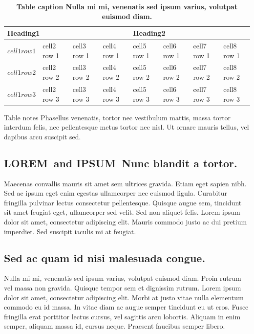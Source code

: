 \documentclass[10pt,letterpaper]{article}
\newcommand{\lorem}{{\bf LOREM}}
\newcommand{\ipsum}{{\bf IPSUM}}
\begin{document}
\begin{table}[!ht]
\begin{adjustwidth}{-2.25in}{0in} %
\caption{
{\bf Table caption Nulla mi mi, venenatis sed ipsum varius, volutpat euismod diam.}}
\begin{tabular}{|l|l|l|l|l|l|l|l|}
\hline
\multicolumn{4}{|l|}{\bf Heading1} & \multicolumn{4}{|l|}{\bf Heading2}\\ \hline
$cell1 row1$ & cell2 row 1 & cell3 row 1 & cell4 row 1 & cell5 row 1 & cell6 row 1 & cell7 row 1 & cell8 row 1\\ \hline
$cell1 row2$ & cell2 row 2 & cell3 row 2 & cell4 row 2 & cell5 row 2 & cell6 row 2 & cell7 row 2 & cell8 row 2\\ \hline
$cell1 row3$ & cell2 row 3 & cell3 row 3 & cell4 row 3 & cell5 row 3 & cell6 row 3 & cell7 row 3 & cell8 row 3\\ \hline
\end{tabular}
\begin{flushleft} Table notes Phasellus venenatis, tortor nec vestibulum mattis, massa tortor interdum felis, nec pellentesque metus tortor nec nisl. Ut ornare mauris tellus, vel dapibus arcu suscipit sed.
\end{flushleft}
\label{table1}
\end{adjustwidth}
\end{table}



\subsection*{\lorem\ and \ipsum\ Nunc blandit a tortor.}

Maecenas convallis mauris sit amet sem ultrices gravida. Etiam eget sapien nibh. Sed ac ipsum eget enim egestas ullamcorper nec euismod ligula. Curabitur fringilla pulvinar lectus consectetur pellentesque. Quisque augue sem, tincidunt sit amet feugiat eget, ullamcorper sed velit. Sed non aliquet felis. Lorem ipsum dolor sit amet, consectetur adipiscing elit. Mauris commodo justo ac dui pretium imperdiet. Sed suscipit iaculis mi at feugiat. 

\subsection*{Sed ac quam id nisi malesuada congue.}

Nulla mi mi, venenatis sed ipsum varius, volutpat euismod diam. Proin rutrum vel massa non gravida. Quisque tempor sem et dignissim rutrum. Lorem ipsum dolor sit amet, consectetur adipiscing elit. Morbi at justo vitae nulla elementum commodo eu id massa. In vitae diam ac augue semper tincidunt eu ut eros. Fusce fringilla erat porttitor lectus cursus, vel sagittis arcu lobortis. Aliquam in enim semper, aliquam massa id, cursus neque. Praesent faucibus semper libero.
\end{document}
